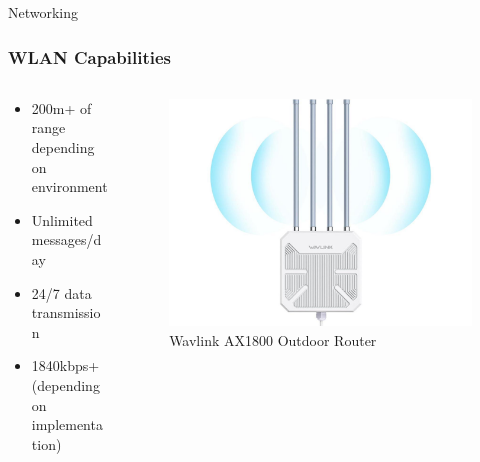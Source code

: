 \documentclass{beamer}
\begin{document}
  \begin{frame}{Networking}
    \frametitle{WLAN Capabilities}
    \begin{columns}
      \begin{column}{0.5\textwidth}
        \begin{itemize}
          \item 200m+ of range depending on environment
          \item Unlimited messages/day
          \item 24/7 data transmission
          \item 1840kbps+ (depending on implementation)
        \end{itemize}
      \end{column}
      \begin{column}{0.5\textwidth}
        \begin{figure}[htbp]
          \centering
          \includegraphics[width=\textwidth]{images/wav_link_outdoor_router.jpg}
          \caption{Wavlink AX1800 Outdoor Router}
          \label{fig:WildFi_infrastructure_overview}
        \end{figure}
      \end{column}
    \end{columns}
  \end{frame}
\end{document}
